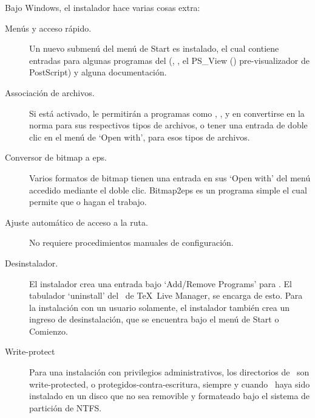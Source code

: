 \documentclass{article}
\begin{document}
Bajo Windows, el instalador hace varias cosas extra:
\begin{description}
\item[Menús y acceso rápido.] Un nuevo submenú del menú de Start es
	instalado, el cual contiene entradas para algunas programas
	del \GUI{} (, , el PS\_View
	() pre-visualizador de PostScript) y alguna
	documentación.
\item [Associación de archivos.] Si está activado, le permitirán a
	programas como , , y
	 en convertirse en la norma para sus
	respectivos tipos de archivos, o tener una entrada de doble
	clic en el menú de `Open with', para esos tipos de archivos.
\item[Conversor de bitmap a eps.] Varios formatos de bitmap tienen una
	entrada  en sus `Open with' del menú accedido
	mediante el doble clic. Bitmap2eps es un programa simple el
	cual permite que  o  hagan el
	trabajo. 
\item[Ajuste automático de acceso a la ruta.] No requiere
	procedimientos manuales de configuración.
\item[Desinstalador.] El instalador crea una entrada bajo `Add/Remove
	Programs' para \TL. El tabulador `uninstall' del \GUI\ de
	\TeX\ Live Manager, se encarga de esto. Para la
	instalación con un usuario solamente, el instalador
	también crea un ingreso de desinstalación, que se
	encuentra bajo el menú de Start o Comienzo. 
\item[Write-protect] Para una instalación con privilegios
	administrativos, los directorios de \TL\ son
	write-protected, o protegidos-contra-escritura,
	siempre y cuando \TL\ haya sido instalado en un disco
	que no sea removible y formateado bajo el sistema de
	partición de NTFS. 
\end{description}
	
\end{document}
